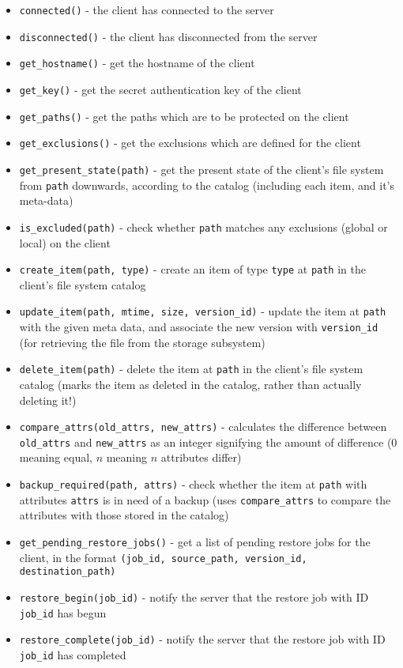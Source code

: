 \begin{itemize}
    \item \verb!connected()! - the client has connected to the server
    \item \verb!disconnected()! - the client has disconnected from the server
    \item \verb!get_hostname()! - get the hostname of the client
    \item \verb!get_key()! - get the secret authentication key of the client
    \item \verb!get_paths()! - get the paths which are to be protected on the
        client
    \item \verb!get_exclusions()! - get the exclusions which are defined for
        the client
    \item \verb!get_present_state(path)! - get the present state of the
        client's file system from \verb!path! downwards, according to the
        catalog (including each item, and it's meta-data)
    \item \verb!is_excluded(path)! - check whether \verb!path! matches any
        exclusions (global or local) on the client
    \item \verb!create_item(path, type)! - create an item of type \verb!type!
        at \verb!path! in the client's file system catalog
    \item \verb!update_item(path, mtime, size, version_id)! - update the item
        at \verb!path! with the given meta data, and associate the new version
        with \verb!version_id! (for retrieving the file from the storage
        subsystem)
    \item \verb!delete_item(path)! - delete the item at \verb!path! in the
        client's file system catalog (marks the item as deleted in the catalog,
        rather than actually deleting it!)
    \item \verb!compare_attrs(old_attrs, new_attrs)! - calculates the
        difference between \verb!old_attrs! and \verb!new_attrs! as an integer
        signifying the amount of difference ($0$ meaning equal, $n$ meaning $n$
        attributes differ)
    \item \verb!backup_required(path, attrs)! - check whether the item at
        \verb!path! with attributes \verb!attrs! is in need of a backup (uses
        \verb!compare_attrs! to compare the attributes with those stored in the
        catalog)
    \item \verb!get_pending_restore_jobs()! - get a list of pending restore
        jobs for the client, in the format
        \verb!(job_id, source_path, version_id, destination_path)!
    \item \verb!restore_begin(job_id)! - notify the server that the restore job
        with ID \verb!job_id! has begun
    \item \verb!restore_complete(job_id)! - notify the server that the restore
        job with ID \verb!job_id! has completed
\end{itemize}


